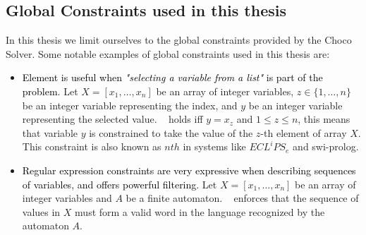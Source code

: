\subsection{Global Constraints used in this thesis}
In this thesis we limit ourselves to the global constraints provided by the Choco Solver.
Some notable examples of global constraints used in this thesis are:
\begin{itemize}
    \item 
    \textcolor{black}{
    Element is useful when \emph{"selecting a variable from a list"} is part of the problem.
    }
    Let $X=[x_1,…,x_n]$ be an array of integer variables, $z \in \{1,…,n\}$ be an integer variable representing the index, and $y$ be an integer variable representing the selected value. ~\cite{DBLP:conf/aaai/HentenryckC88,van1999opl} holds iff $y=x_z$ and $1\leq z \leq n$, this means that   variable $y$ is constrained to take the value of the $z$-th element of array $X$.
    This constraint is also known as $nth$ in systems like $ECL^iPS_e$ and swi-prolog.
    
    \item 
    \textcolor{black}{
    Regular expression constraints are very expressive when describing sequences of variables, and offers powerful filtering.
    }
    Let $X=[x_1,…,x_n]$ be an array of integer variables and $A$ be a finite automaton. ~\cite{pesant2004regular} enforces that the sequence of values in $X$ must form a valid word in the language recognized by the automaton $A$. 
    
    

\end{itemize}
